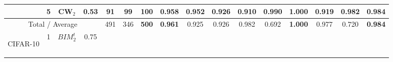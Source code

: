 \begin{table}[tph]
\begin{adjustbox}{angle=90}
{\begin{tabular}{c|c|cc|ccc|ccc|ccc|ccc}
                \\
                                                                        & 5
                                                                        & CW$_{2}$                       & 0.53
                                                                        & 91                             & 99
                                                                        &
                \textbf{100}
                                                                        &
                \textbf{0.958}
                                                                        & 0.952
                                                                        & 0.926                          &
                0.910                                                   & 0.990
                                                                        &
                \textbf{1.000}
                                                                        & 0.919
                                                                        &
                \textbf{0.982}
                                                                        & 0.984
                \\
                \hline
                \multicolumn{4}{c|}{Total / Average}                    & 491
                                                                        & 346                            &
                \textbf{500}
                                                                        &
                \textbf{0.961}
                                                                        & 0.925
                                                                        & 0.926
                                                                        & 0.982
                                                                        & 0.692
                                                                        &
                \textbf{1.000}
                                                                        & 0.977
                                                                        & 0.720
                                                                        &
                \textbf{0.984}
                \\
                \hline
                \multirow{6}{*}{\begin{turn}{90}CIFAR-10\end{turn}}     & 1
                                                                        & $BIM_{2}^{t}$                  & 0.75 &

\end{tabular}}
\end{adjustbox}
\end{table}
